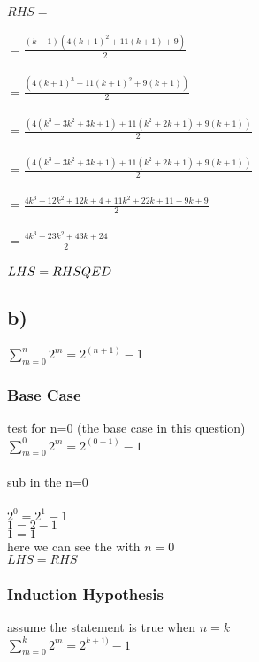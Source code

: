 \documentclass[english,10pt,a4paper]{report}
\begin{document}
$RHS =  $\\\\
$=\frac{(k+1)(4(k+1)^2 + 11(k+1) + 9)}{2}$\\\\
$=  \frac{(4(k+1)^3+ 11(k+1)^{2} + 9(k+1))}{2}$\\\\
$=  \frac{(4(k^{3}+3k^{2}+3k+1) + 11(k^{2}+2k+1) + 9(k+1))}{2}$\\\\
$=  \frac{(4(k^{3}+3k^{2}+3k+1) + 11(k^{2}+2k+1) + 9(k+1))}{2}$\\\\
$=  \frac{4k^{3}+12k^{2}+12k+4 + 11k^{2}+22k+11 + 9k+9}{2}$\\\\
$=\frac{4 k^3+ 23 k^2+43 k + 24 }{2}$\\\\




$LHS= RHS \\ QED$


\subsection*{b)}
$ \sum_{m=0}^{n}   2^m = 2^{(n+1)} - 1 $

\subsubsection{Base Case}

test for n=0 (the base case in this question)\\
$ \sum_{m=0}^{0}   2^m = 2^{(0+1)} - 1 $\\
\\
sub in the n=0\\\\
$2^{0}= 2^{1} -1 $\\
$1=2-1$\\
$1 = 1$\\

here we can see the with $n=0$\\ $LHS = RHS$

\subsubsection{Induction Hypothesis}
assume the statement is true when  $n = k $\\
$ \sum_{m=0}^{k}   2^m = 2^{k+1)} - 1 $\\
\end{document}
